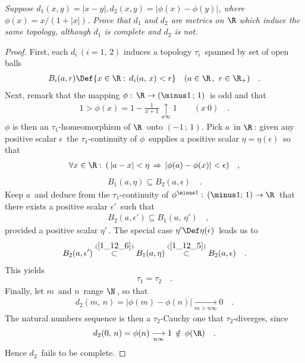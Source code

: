 \textit{
Suppose %
%
  $d_{1}(x,y)=|x-y|, d_{2}(x,y)=|\phi(x)-\phi(y)|$, %
%
where %
%
  $\phi(x)={x}/{(1+\lvert x \rvert )}$. %
%
Prove that $d_{1}$ and $d_{2}$ are metrics on $\R$ which induce %
the same topology, although $d_{1}$ is complete and $d_{2}$ is not.
}
\begin{proof}First, each $d_i\, (i=1,\,2)$ induces a topology $\tau_i\,$ spanned by set of open balls 
\begin{align}\label{1_12_2}
B_i(a,r)\Def \{ x\in \R:\, d_i (a,\,x) < r\} \quad (a\in \R\,,\, \, r\in \R_+ )\quad . \end{align}
Next, remark that the mapping $\phi:\,  \R\to (\minus 1\, ;\,1)\,$ is odd and that
\begin{align}\label{1_12_1}
1> \phi(x)=1-\frac{1}{x+1} \underset{x\infty}{\uparrow} 1 \quad \quad (x\> 0) \quad.
\end{align}
$\phi$ is then an $\tau_1$-homeomorphism of $\R\,$ onto $(\minus 1\,;\, 1)$. Pick $a\,$ in $\R\,$: given any positive scalar $\epsilon\,$ the $\tau_1$-continuity of $\phi\,$ supplies a positive scalar $\eta=\eta(\epsilon)\,$ so that 
\begin{align}
\forall x \in\R:\: (\, |a-x|< \eta \,\Rightarrow\, |\phi(a)-\phi(x)|< \epsilon)\quad , \end{align}
\ie
\begin{align}\label{1_12_5}
B_1(a,\eta)\subseteq B_2(a,\epsilon)\quad  .\end{align}
Keep $a\,$ and deduce from the $\tau_1$-continuity of $\phi^{\minus 1}:\, (\minus 1;\, 1)\to \R\,$ that there exists a positive scalar $\epsilon'\,$ such that 
\begin{align} \label{1_12_6}
\quad B_{2}(a,\epsilon')\subseteq B_{1}(a,\,\eta')  \quad  ,\end{align}
provided a positive scalar $\eta'\,$. The special case $\eta' \Def \eta(\epsilon)\,$ leads us to 
\begin{align}
B_{2}(a,\epsilon')\overset{(\ref{1_12_6})}{\subset} B_{1}(a,\eta ) \overset{(\ref{1_12_5})}{\subset} B_2(a,\epsilon)\quad . \end{align}
This yields
\begin{align}\tau_1=\tau_2 \quad . \end{align}
Finally, let $m\,$ and $n\,$ range $\N\,$, so that
\begin{align}
\quad d_{2}(m,\,n)=|\phi(m)-\phi(n)| {\underset{m> n \infty}{\longrightarrow}}0\quad .
\quad \end{align}
The natural numbers sequence is then a $\tau_2$-Cauchy one that $\tau_2$-diverges, since
\begin{align}
d_{2}(0,\,n) = \phi (n) \underset{n\infty}{\longrightarrow}1 \, \notin \, \phi(\R) \quad .\end{align}
Hence $d_2\,$ fails to be complete.
\end{proof}